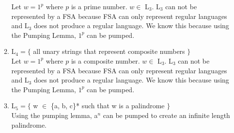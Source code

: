 \documentclass[a4paper]{article}
\begin{document}
\begin{enumerate}
\begin{enumerate}
      Let $w = 1^{p}$ where $p$ is a prime number. $w \in$ L$_{3}$. L$_{3}$ can not be 
      represented by a FSA because FSA can only represent regular languages and 
      L$_{3}$ does not produce a regular language. We know this because using the 
      Pumping Lemma, $1^{p}$ can be pumped. \\

      \item L$_{4} = \{$ all unary strings that represent composite numbers $\}$ \\
      
      Let $w = 1^{p}$ where $p$ is a composite number. $w \in$ L$_{3}$. L$_{3}$ can not be 
      represented by a FSA because FSA can only represent regular languages and 
      L$_{3}$ does not produce a regular language. We know this because using the 
      Pumping Lemma, $1^{p}$ can be pumped. \\
    

      \item L$_{5} = \{$ w $\in$ \{a, b, c\}* such that w is a palindrome $\}$ \\
      
      Using the pumping lemma, a$^{n}$ can be pumped to create an infinite length
      palindrome. 
    

    \end{enumerate}



  \end{enumerate}
\end{document}
